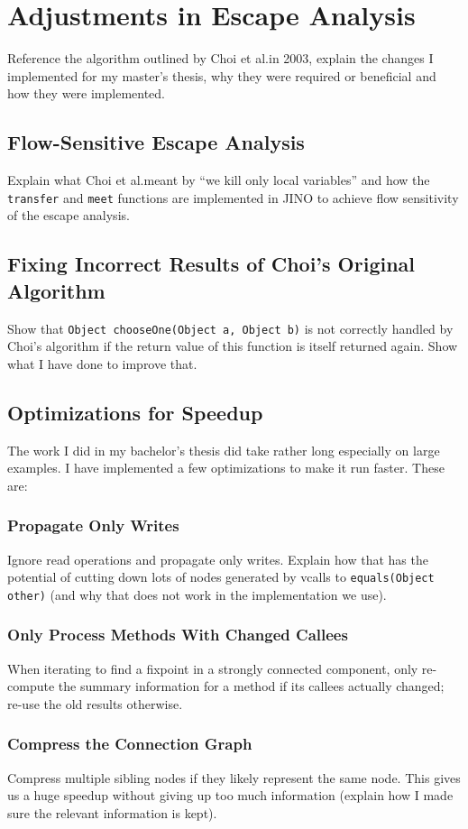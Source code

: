 
\chapter{Adjustments in Escape Analysis}
	\label{chapter:changes-eea}
	Reference the algorithm outlined by Choi et al.\@ in 2003, explain the changes I implemented for my master's thesis,
	why they were required or beneficial and how they were implemented.

	\section{Flow-Sensitive Escape Analysis}
		\label{sec:changes-eea:flow-sensitive}
		Explain what Choi et al.\@ meant by \enquote{we kill only local variables} and how the \texttt{transfer} and
		\texttt{meet} functions are implemented in JINO to achieve flow sensitivity of the escape analysis.

	\section{Fixing Incorrect Results of Choi's Original Algorithm}
		\label{sec:changes-eea:bug}
		Show that \texttt{Object chooseOne(Object a, Object b)} is not correctly handled by Choi's algorithm if the return
		value of this function is itself returned again. Show what I have done to improve that.

	\section{Optimizations for Speedup}
		\label{sec:changes-eea:opt}
		The work I did in my bachelor's thesis did take rather long especially on large examples. I have implemented a few
		optimizations to make it run faster. These are:
		
		\subsection{Propagate Only Writes}
			\label{sub:changes-eea:opt:writeonly}
			Ignore read operations and propagate only writes. Explain how that has the potential of cutting down lots of nodes
			generated by vcalls to \texttt{equals(Object other)} (and why that does not work in the implementation we use).

		\subsection{Only Process Methods With Changed Callees}
			\label{sub:changes-eea:opt:quick-fixpoint}
			When iterating to find a fixpoint in a strongly connected component, only re-compute the summary information for
			a method if its callees actually changed; re-use the old results otherwise.

		\subsection{Compress the Connection Graph}
			\label{sub:changes-eea:opt:compression}
			Compress multiple sibling nodes if they likely represent the same node. This gives us a huge speedup without
			giving up too much information (explain how I made sure the relevant information is kept).
